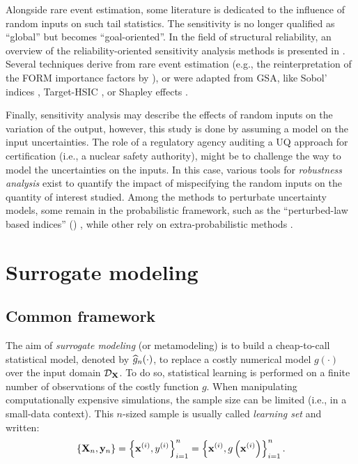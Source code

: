Alongside rare event estimation, some literature is dedicated to the influence of random inputs on such tail statistics. 
The sensitivity is no longer qualified as ``global'' but becomes ``goal-oriented''. 
In the field of structural reliability, an overview of the reliability-oriented sensitivity analysis methods is presented in \citet{chabridon_2018_thesis}. 
Several techniques derive from rare event estimation (e.g., the reinterpretation of the FORM importance factors by \citet{papaioannou_2021_rosa_form}), or were adapted from GSA, like Sobol' indices \citep{wei_2012_rosa,chabridon_2018_thesis,perrin_2019_rosa,ehre_2020_rosa}, Target-HSIC \citep{marrel_chabridon_2021}, or Shapley effects \citep{ilidrissi_2021_rosa}.  

Finally, sensitivity analysis may describe the effects of random inputs on the variation of the output, however, this study is done by assuming a model on the input uncertainties. 
The role of a regulatory agency auditing a UQ approach for certification (i.e., a nuclear safety authority), might be to challenge the way to model the uncertainties on the inputs.  
In this case, various tools for \textit{robustness analysis} exist to quantify the impact of mispecifying the random inputs on the quantity of interest studied. 
Among the methods to perturbate uncertainty models, some remain in the probabilistic framework, such as the ``perturbed-law based indices'' () \citep{lemaitre_2015_PLI,iooss_2022_pli}, while other rely on extra-probabilistic methods \citep{ajenjo_2022_structural_safety}. 




\section{Surrogate modeling} \label{sec:surrogate}

\subsection{Common framework}

The aim of \textit{surrogate modeling} (or metamodeling) is to build a cheap-to-call statistical model, 
denoted by $\widehat{g}_n(\cdot)$, to replace a costly numerical model $g(\cdot)$ over the input domain $\mathcal{D}_{{\bf X}}$. 
To do so, statistical learning is performed on a finite number of observations of the costly function $g$. 
When manipulating computationally expensive simulations, the sample size can be limited (i.e., in a small-data context). 
This $n$-sized sample is usually called \textit{learning set} and written: 
\begin{equation}
    \left\{{\bf X}_n, {\bf y}_n\right\} = \left\{{\bf x}^{(i)}, y^{(i)}\right\}_{i=1}^n
                                = \left\{{\bf x}^{(i)}, g\left({\bf x}^{(i)}\right)\right\}_{i=1}^n.    
\end{equation}


